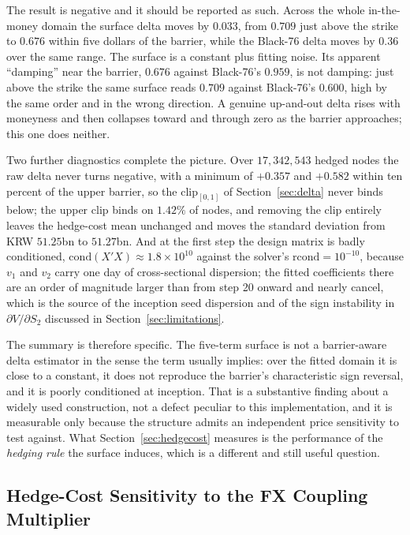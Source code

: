 \documentclass[11pt,a4paper]{article}
\begin{document}
The result is negative and it should be reported as such. Across the whole in-the-money domain the surface delta moves by $0.033$, from $0.709$ just above the strike to $0.676$ within five dollars of the barrier, while the Black-76 delta moves by $0.36$ over the same range. The surface is a constant plus fitting noise. Its apparent ``damping'' near the barrier, $0.676$ against Black-76's $0.959$, is not damping: just above the strike the same surface reads $0.709$ against Black-76's $0.600$, high by the same order and in the wrong direction. A genuine up-and-out delta rises with moneyness and then collapses toward and through zero as the barrier approaches; this one does neither.

Two further diagnostics complete the picture. Over $17{,}342{,}543$ hedged nodes the raw delta never turns negative, with a minimum of $+0.357$ and $+0.582$ within ten percent of the upper barrier, so the $\mathrm{clip}_{[0,1]}$ of Section~\ref{sec:delta} never binds below; the upper clip binds on $1.42\%$ of nodes, and removing the clip entirely leaves the hedge-cost mean unchanged and moves the standard deviation from KRW $51.25$bn to $51.27$bn. And at the first step the design matrix is badly conditioned, $\mathrm{cond}(X'X)\approx1.8\times10^{10}$ against the solver's $\mathrm{rcond}=10^{-10}$, because $v_1$ and $v_2$ carry one day of cross-sectional dispersion; the fitted coefficients there are an order of magnitude larger than from step 20 onward and nearly cancel, which is the source of the inception seed dispersion and of the sign instability in $\partial V/\partial S_2$ discussed in Section~\ref{sec:limitations}.

The summary is therefore specific. The five-term surface is not a barrier-aware delta estimator in the sense the term usually implies: over the fitted domain it is close to a constant, it does not reproduce the barrier's characteristic sign reversal, and it is poorly conditioned at inception. That is a substantive finding about a widely used construction, not a defect peculiar to this implementation, and it is measurable only because the structure admits an independent price sensitivity to test against. What Section~\ref{sec:hedgecost} measures is the performance of the \emph{hedging rule} the surface induces, which is a different and still useful question.

\subsection{Hedge-Cost Sensitivity to the FX Coupling Multiplier}
\label{sec:fxsweep}
\end{document}
